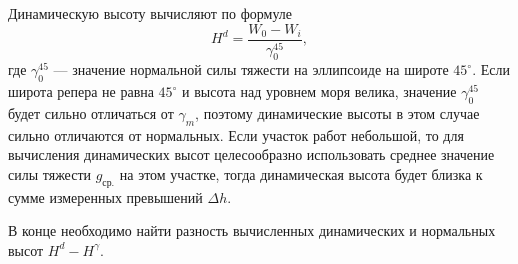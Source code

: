 \documentclass[11pt, a4paper,addpoints]{exam}
\theoremstyle{remark}
\begin{document}
\begin{questions}
    Динамическую высоту вычисляют по формуле
    \begin{equation*}
        H^d = \dfrac{W_0 - W_i}{\gamma_0^{45}},
    \end{equation*}
    где $\gamma_0^{45}$ --- значение нормальной силы тяжести на эллипсоиде на широте $45^\circ$.
    Если широта репера не равна $45^\circ$ и высота над уровнем моря велика, значение
    $\gamma_0^{45}$ будет сильно отличаться от $\gamma_m$, поэтому динамические высоты в этом случае
    сильно отличаются от нормальных. Если участок работ небольшой, то для вычисления динамических
    высот целесообразно использовать среднее значение силы тяжести $g_{\textrm{ср.}}$ на этом
    участке, тогда динамическая высота будет близка к сумме измеренных превышений $\Delta h$.

    В конце необходимо найти разность вычисленных динамических и нормальных высот $H^d - H^\gamma$.
\end{questions}

\end{document}
